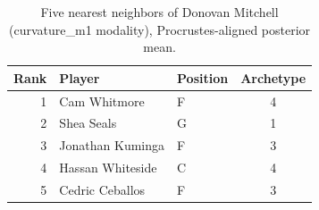 \begin{table}[htbp]
  \centering\small
  \begin{tabular}{rllc}
    \toprule
    Rank & Player & Position & Archetype \\
    \midrule
    1 & Cam Whitmore & F & 4 \\
    2 & Shea Seals & G & 1 \\
    3 & Jonathan Kuminga & F & 3 \\
    4 & Hassan Whiteside & C & 4 \\
    5 & Cedric Ceballos & F & 3 \\
    \bottomrule
  \end{tabular}
  \caption{Five nearest neighbors of Donovan Mitchell (curvature_m1 modality), Procrustes-aligned posterior mean.}
  \label{tab:Donovan_Mitchell_neighbors_curvature_m1}
\end{table}

